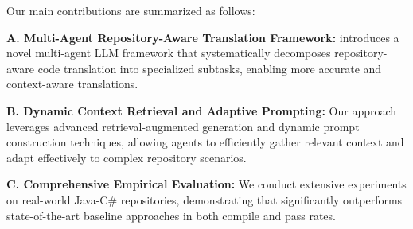 Our main contributions are summarized as follows:

\textbf{A. Multi-Agent Repository-Aware Translation Framework:} \toolname introduces a novel multi-agent LLM framework that systematically decomposes repository-aware code translation into specialized subtasks, enabling more accurate and context-aware translations.

\textbf{B. Dynamic Context Retrieval and Adaptive Prompting:} Our approach leverages advanced retrieval-augmented generation and dynamic prompt construction techniques, allowing agents to efficiently gather relevant context and adapt effectively to complex repository scenarios.

\textbf{C. Comprehensive Empirical Evaluation:} We conduct extensive experiments on real-world Java-C\# repositories, demonstrating that \toolname significantly outperforms state-of-the-art baseline approaches in both compile and pass rates.